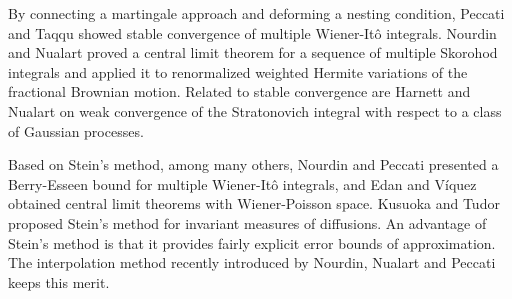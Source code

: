 \documentclass[a4paper]{article}
\numberwithin{equation}{section}
\begin{document}
By connecting a martingale approach and deforming a nesting condition, 
Peccati and Taqqu \cite{peccati2008stable} showed stable convergence of %
multiple Wiener-It\^o integrals. 
Nourdin and Nualart \cite{nourdin2010central} proved a central limit theorem for a sequence of multiple
Skorohod integrals and applied it to renormalized weighted Hermite
variations of the fractional Brownian motion. 
Related to stable convergence are Harnett and Nualart \cite{harnett2012weak,harnett2013central} 
on weak convergence of the Stratonovich integral with respect to a class of Gaussian processes. 

Based on Stein's method, among many others, 
Nourdin and Peccati \cite{nourdin2009stein} presented a Berry-Esseen bound for multiple Wiener-It\^o integrals, %
and 
Edan and V\'iquez \cite{eden2015nourdin} obtained central limit theorems with Wiener-Poisson space. 
Kusuoka and Tudor \cite{kusuoka2012stein} proposed Stein's method for invariant measures of diffusions. 
An advantage of Stein's method is that it provides fairly explicit error bounds of approximation. 
The interpolation method recently introduced by Nourdin, Nualart and Peccati \cite{nourdin2016quantitative} 
keeps this merit. 
\end{document}
